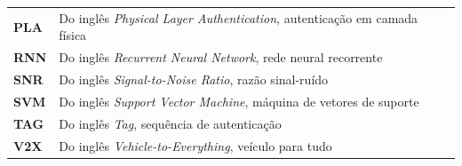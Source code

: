\documentclass{sbrt}
\begin{document}
{\begin{tabular}{@{}p{1.9cm}p{5.9cm}@{}}
\textbf{PLA}       & Do inglês \textit{Physical Layer Authentication}, autenticação em camada física \\
\textbf{RNN}       & Do inglês \textit{Recurrent Neural Network}, rede neural recorrente \\
\textbf{SNR}       & Do inglês \textit{Signal-to-Noise Ratio}, razão sinal-ruído \\
\textbf{SVM}       & Do inglês \textit{Support Vector Machine}, máquina de vetores de suporte \\
\textbf{TAG}       & Do inglês \textit{Tag}, sequência de autenticação \\
\textbf{V2X}       & Do inglês \textit{Vehicle-to-Everything}, veículo para tudo \\
\end{tabular}
}
\end{document}

